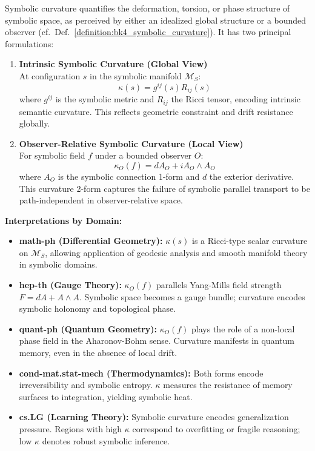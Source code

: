 \begin{definition}
\label{definition:bk4_symbolic_curvature_formulations}
Symbolic curvature quantifies the deformation, torsion, or phase structure of symbolic space, as perceived by either an idealized global structure or a bounded observer (cf.~Def.~\ref{definition:bk4_symbolic_curvature}). It has two principal formulations:

\begin{enumerate}
    \item \textbf{Intrinsic Symbolic Curvature (Global View)} \\
    At configuration $s$ in the symbolic manifold $\mathcal{M}_S$:
    \[
    \kappa(s) = g^{ij}(s) R_{ij}(s)
    \]
    where $g^{ij}$ is the symbolic metric and $R_{ij}$ the Ricci tensor, encoding intrinsic semantic curvature. This reflects geometric constraint and drift resistance globally.

    \item \textbf{Observer-Relative Symbolic Curvature (Local View)} \\
    For symbolic field $f$ under a bounded observer $O$:
    \[
    \kappa_O(f) = dA_O + i A_O \wedge A_O
    \]
    where $A_O$ is the symbolic connection 1-form and $d$ the exterior derivative. This curvature 2-form captures the failure of symbolic parallel transport to be path-independent in observer-relative space.
\end{enumerate}

\vspace{1em}
\textbf{Interpretations by Domain:}

\begin{itemize}
    \item \textbf{math-ph (Differential Geometry):} $\kappa(s)$ is a Ricci-type scalar curvature on $\mathcal{M}_S$, allowing application of geodesic analysis and smooth manifold theory in symbolic domains.

    \item \textbf{hep-th (Gauge Theory):} $\kappa_O(f)$ parallels Yang-Mills field strength $F = dA + A \wedge A$. Symbolic space becomes a gauge bundle; curvature encodes symbolic holonomy and topological phase.

    \item \textbf{quant-ph (Quantum Geometry):} $\kappa_O(f)$ plays the role of a non-local phase field in the Aharonov-Bohm sense. Curvature manifests in quantum memory, even in the absence of local drift.

    \item \textbf{cond-mat.stat-mech (Thermodynamics):} Both forms encode irreversibility and symbolic entropy. $\kappa$ measures the resistance of memory surfaces to integration, yielding symbolic heat.

    \item \textbf{cs.LG (Learning Theory):} Symbolic curvature encodes generalization pressure. Regions with high $\kappa$ correspond to overfitting or fragile reasoning; low $\kappa$ denotes robust symbolic inference.
\end{itemize}
\end{definition}

